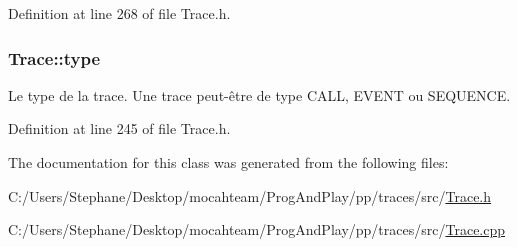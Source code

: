 Definition at line 268 of file Trace.\+h.

\subsubsection[{\texorpdfstring{type}{type}}]{ Trace\+::type\hspace{0.3cm}{\ttfamily [protected]}}\hypertarget{class_trace_a9f90324e4302d53892143da44cc63054}{}\label{class_trace_a9f90324e4302d53892143da44cc63054}
Le type de la trace. Une trace peut-\/être de type C\+A\+LL, E\+V\+E\+NT ou S\+E\+Q\+U\+E\+N\+CE. 

Definition at line 245 of file Trace.\+h.



The documentation for this class was generated from the following files\+:\begin{DoxyCompactItemize}
\item 
C\+:/\+Users/\+Stephane/\+Desktop/mocahteam/\+Prog\+And\+Play/pp/traces/src/\hyperlink{_trace_8h}{Trace.\+h}\item 
C\+:/\+Users/\+Stephane/\+Desktop/mocahteam/\+Prog\+And\+Play/pp/traces/src/\hyperlink{_trace_8cpp}{Trace.\+cpp}\end{DoxyCompactItemize}
